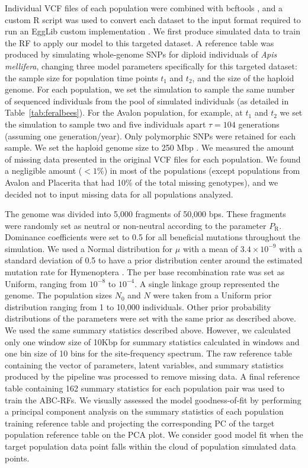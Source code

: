 \documentclass[a4paper, 12pt]{article}
\begin{document}
Individual VCF files of each population were combined with bcftools \citep{Li:2011kr}, and a custom R script was used to convert each dataset to the input format required to run an EggLib custom implementation \citep[in][]{Pavinato:2021}. We first produce simulated data to train the RF to apply our model to this targeted dataset. A reference table was produced by simulating whole-genome SNPs for diploid individuals of \textit{Apis mellifera}, changing three model parameters specifically for this targeted dataset: the sample size for population time points $t_1$ and $t_2$, and the size of the haploid genome. For each population, we set the simulation to sample the same number of sequenced individuals from the pool of simulated individuals (as detailed in Table~\ref{tab:feralbees}). For the Avalon population, for example, at $t_1$ and $t_2$ we set the simulation to sample two and five individuals apart $\tau = 104$ generations (assuming one generation/year). Only polymorphic SNPs were retained for each sample. We set the haploid genome size to 250 Mbp \citep[similar to the most recent estimates of \textit{A. mellifera} genome size;][]{Elsik:2014hf}. We measured the amount of missing data presented in the original VCF files \citep{Cridland:2018fx} for each population. We found a negligible amount ($< 1\%$) in most of the populations (except populations from Avalon and Placerita that had 10\% of the total missing genotypes), and we decided not to input missing data for all populations analyzed.

The genome was divided into 5,000 fragments of 50,000 bps. These fragments were randomly set as neutral or non-neutral according to the parameter $P_{\mathrm{R}}$. Dominance coefficients were set to 0.5 for all beneficial mutations throughout the simulation. We used a Normal distribution for $\mu$ with a mean of $3.4\times 10^{-9}$ with a standard deviation of 0.5 to have a prior distribution center around the estimated mutation rate for Hymenoptera \citep{Liu:2017ea}. The per base recombination rate was set as Uniform, ranging from $10^{-8}$ to $10^{-4}$. A single linkage group represented the genome. The population sizes $N_{\mathrm{0}}$ and $N$ were taken from a Uniform prior distribution ranging from 1 to 10,000 individuals. Other prior probability distributions of the parameters were set with the same prior as described above. We used the same summary statistics described above. However, we calculated only one window size of 10Kbp for summary statistics calculated in windows and one bin size of 10 bins for the site-frequency spectrum. The raw reference table containing the vector of parameters, latent variables, and summary statistics produced by the pipeline was processed to remove missing data. A final reference table containing 162 summary statistics for each population pair was used to train the ABC-RFs. We visually  assessed the model goodness-of-fit by performing a principal component analysis on the summary statistics of each population training reference table and projecting the corresponding PC of the target population reference table on the PCA plot. We consider good model fit when the target population data point falls within the cloud of population simulated data points.
\end{document}
